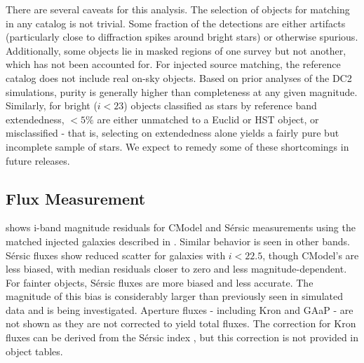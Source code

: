 There are several caveats for this analysis.
The selection of objects for matching in any catalog is not trivial.
Some fraction of the detections are either artifacts (particularly close to diffraction spikes around bright stars) or otherwise spurious.
Additionally, some objects lie in masked regions of one survey but not another, which has not been accounted for. 
For injected source matching, the reference catalog does not include real on-sky objects.
Based on prior analyses of the \gls{DC2} simulations, purity is generally higher than completeness at any given magnitude.
Similarly, for bright ($i<23$) objects classified as stars by reference band extendedness, $<5\%$ are either unmatched to a Euclid or HST object, or misclassified - that is, selecting on extendedness alone yields a fairly pure but incomplete sample of stars.
We expect to remedy some of these shortcomings in future releases.

\subsection{Flux Measurement}
\label{ssec:fluxes}

 shows i-band magnitude residuals for CModel and S\'ersic measurements using the matched injected galaxies described in .
Similar behavior is seen in other bands.
S\'ersic fluxes show reduced scatter for galaxies with $i<22.5$, though CModel's are less biased, with median residuals closer to zero and less magnitude-dependent.
For fainter objects, S\'ersic fluxes are more biased and less accurate.
The magnitude of this bias is considerably larger than previously seen in simulated data and is being investigated.
Aperture fluxes - including Kron and \gls{GAaP} - are not shown as they are not corrected to yield total fluxes.
The correction for Kron fluxes can be derived from the S\'ersic index \citep{2005PASA...22..118G}, but this correction is not provided in object tables.

